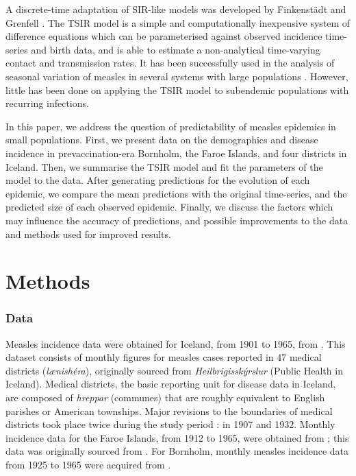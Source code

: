 \documentclass[10pt]{article}
\begin{document}
A discrete-time adaptation of SIR-like models was developed by Finkenst\"{a}dt and Grenfell \cite{Finkenstadt2000}. The TSIR model is a simple and computationally inexpensive system of difference equations which can be parameterised against observed incidence time-series and birth data, and is able to estimate a non-analytical time-varying contact and transmission rates. It has been successfully used in the analysis of seasonal variation of measles in several systems with large populations \cite{Bjornstad2002, Grenfell2002, Glass2003, Metcalf2010}. However, little has been done on applying the TSIR model to subendemic populations with recurring infections.

In this paper, we address the question of predictability of measles epidemics in small populations. First, we present data on the demographics and disease incidence in prevaccination-era Bornholm, the Faroe Islands, and four districts in Iceland. Then, we summarise the TSIR model and fit the parameters of the model to the data. After generating predictions for the evolution of each epidemic, we compare the mean predictions with the original time-series, and the predicted size of each observed epidemic. Finally, we discuss the factors which may influence the accuracy of predictions, and possible improvements to the data and methods used for improved results.














\section*{Methods}

\subsubsection*{Data}

Measles incidence data were obtained for Iceland, from 1901 to 1965, from \cite{Cliff1981}. This dataset consists of monthly figures for measles cases reported in 47 medical districts (\textit{l\ae nish\'{e}ra\dh{}}), originally sourced from \textit{Heilbrig\dh{}issk\'{y}rslur} (Public Health in Iceland). Medical districts, the basic reporting unit for disease data in Iceland, are composed of \textit{hreppar} (communes) that are roughly equivalent to English parishes or American townships. Major revisions to the boundaries of medical districts took place twice during the study period : in 1907 and 1932. Monthly incidence data for the Faroe Islands, from 1912 to 1965, were obtained from \cite{Cliff2000}; this data was originally sourced from \cite{Lancaster1990}. For Bornholm, monthly measles incidence data from 1925 to 1965 were acquired from \cite{Kingdom}.
\end{document}
